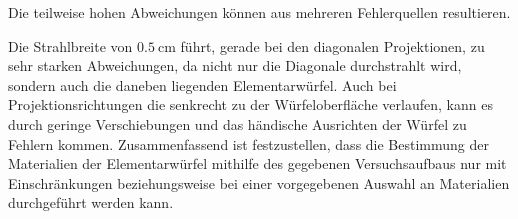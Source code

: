 Die teilweise hohen Abweichungen können aus mehreren Fehlerquellen resultieren.

Die Strahlbreite von $\qty{0.5}{\centi\meter}$ führt, gerade bei den diagonalen Projektionen, zu sehr starken Abweichungen,
da nicht nur die Diagonale durchstrahlt wird, sondern auch die daneben liegenden Elementarwürfel.
Auch bei Projektionsrichtungen die senkrecht zu der Würfeloberfläche verlaufen, kann es durch geringe Verschiebungen und das händische Ausrichten
der Würfel zu Fehlern kommen.
Zusammenfassend ist festzustellen, dass die Bestimmung der Materialien der Elementarwürfel mithilfe des gegebenen Versuchsaufbaus nur mit Einschränkungen
beziehungsweise bei einer vorgegebenen Auswahl an Materialien durchgeführt werden kann.
